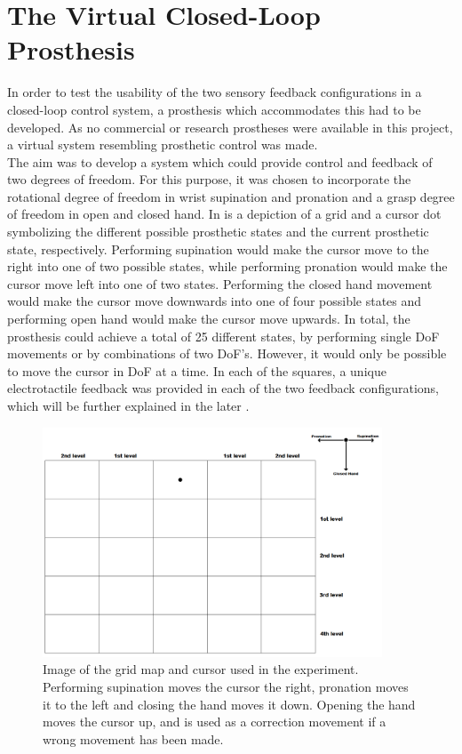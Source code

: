 
\section{The Virtual Closed-Loop Prosthesis}

In order to test the usability of the two sensory feedback configurations in a closed-loop control system, a prosthesis which accommodates this had to be developed. As no commercial or research prostheses were available in this project, a virtual system resembling prosthetic control was made. \\
The aim was to develop a system which could provide control and feedback of two degrees of freedom. For this purpose, it was chosen to incorporate the rotational degree of freedom in wrist supination and pronation and a grasp degree of freedom in open and closed hand. In  is a depiction of a grid and a cursor dot symbolizing the different possible prosthetic states and the current prosthetic state, respectively. Performing supination would make the cursor move to the right into one of two possible states, while performing pronation would make the cursor move left into one of two states. Performing the closed hand movement would make the cursor move downwards into one of four possible states and performing open hand would make the cursor move upwards. In total, the prosthesis could achieve a total of 25 different states, by performing single DoF movements or by combinations of two DoF's. However, it would only be possible to move the cursor in DoF at a time. In each of the squares, a unique electrotactile feedback was provided in each of the two feedback configurations, which will be further explained in the later .      
     

\begin{figure}[H]                 
	\includegraphics[width=0.9\textwidth]{figures/gridmap2}  
	\caption{Image of the grid map and cursor used in the experiment. Performing supination moves the cursor the right, pronation moves it to the left and closing the hand moves it down. Opening the hand moves the cursor up, and is used as a correction movement if a wrong movement has been made.}
	\label{fig:meth:gridmap} 
\end{figure}

